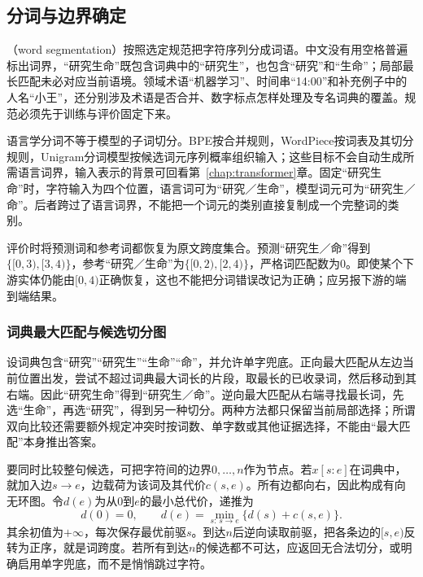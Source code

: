 \subsection{分词与边界确定}
\label{sec:nlp-analysis-segmentation}

（word segmentation）按照选定规范把字符序列分成词语。中文没有用空格普遍标出词界，“研究生命”既包含词典中的“研究生”，也包含“研究”和“生命”；局部最长匹配未必对应当前语境。领域术语“机器学习”、时间串“14:00”和补充例子中的人名“小王”，还分别涉及术语是否合并、数字标点怎样处理及专名词典的覆盖。规范必须先于训练与评价固定下来。

语言学分词不等于模型的子词切分。BPE按合并规则，WordPiece按词表及其切分规则，Unigram分词模型按候选词元序列概率组织输入；这些目标不会自动生成所需语言词界，输入表示的背景可回看第~\ref{chap:transformer}章。固定“研究生命”时，字符输入为四个位置，语言词可为“研究／生命”，模型词元可为“研究生／命”。后者跨过了语言词界，不能把一个词元的类别直接复制成一个完整词的类别。

评价时将预测词和参考词都恢复为原文跨度集合。预测“研究生／命”得到$\{[0,3),[3,4)\}$，参考“研究／生命”为$\{[0,2),[2,4)\}$，严格词匹配数为0。即使某个下游实体仍能由$[0,4)$正确恢复，这也不能把分词错误改记为正确；应另报下游的端到端结果。

\subsubsection{词典最大匹配与候选切分图}
\label{sec:nlp-analysis-dictionary}

设词典包含“研究”“研究生”“生命”“命”，并允许单字兜底。正向最大匹配从左边当前位置出发，尝试不超过词典最大词长的片段，取最长的已收录词，然后移动到其右端。因此“研究生命”得到“研究生／命”。逆向最大匹配从右端寻找最长词，先选“生命”，再选“研究”，得到另一种切分。两种方法都只保留当前局部选择；所谓双向比较还需要额外规定冲突时按词数、单字数或其他证据选择，不能由“最大匹配”本身推出答案。

要同时比较整句候选，可把字符间的边界$0,\ldots,n$作为节点。若$x[s:e]$在词典中，就加入边$s\to e$，边载荷为该词及其代价$c(s,e)$。所有边都向右，因此构成有向无环图。令$d(e)$为从0到$e$的最小总代价，递推为
\begin{equation}
  d(0)=0,\qquad
  d(e)=\min_{s:\,s\to e}\{d(s)+c(s,e)\}.
  \label{eq:nlp-analysis-word-path}
\end{equation}
其余初值为$+\infty$，每次保存最优前驱$s$。到达$n$后逆向读取前驱，把各条边的$[s,e)$反转为正序，就是词跨度。若所有到达$n$的候选都不可达，应返回无合法切分，或明确启用单字兜底，而不是悄悄跳过字符。

